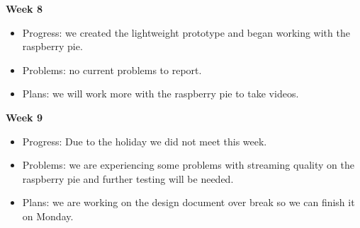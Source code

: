 \textbf{Week 8}
\begin{itemize}
    \item Progress: we created the lightweight prototype and began working with the raspberry pie.
    \item Problems: no current problems to report.
    \item Plans: we will work more with the raspberry pie to take videos.
\end{itemize}
\newpage
\textbf{Week 9}
\begin{itemize}
    \item Progress: Due to the holiday we did not meet this week.
    \item Problems: we are experiencing some problems with streaming quality on the raspberry pie and further testing will be needed.
    \item Plans: we are working on the design document over break so we can finish it on Monday. 
\end{itemize}


